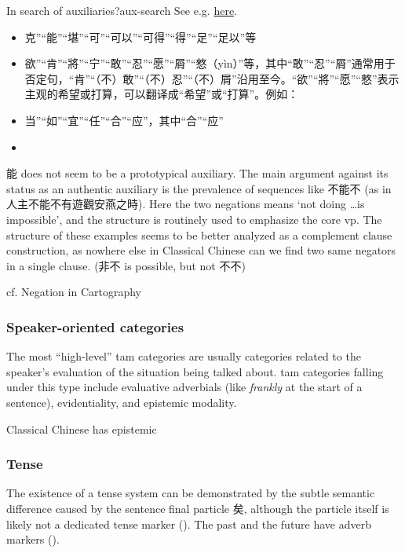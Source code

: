 \documentclass[UTF8, a4paper, oneside, scheme=plain, 12pt]{ctexrep}
\newcommand{\form}[1]{\emph{#1}}
\newcommand{\translate}[1]{`#1'}
\begin{document}
\begin{todobox}{In search of auxiliaries?}{aux-search}
    See e.g. \href{http://www.ziyexing.com/files-5/guhanyu/guhanyu_3_1.htm}{here}.
    \begin{itemize}
        \item 克”“能”“堪”“可”“可以”“可得”“得”“足”“足以”等
        \item 欲”“肯”“將”“宁”“敢”“忍”“愿”“屑”“憗（yìn）”等，其中“敢”“忍”“屑”通常用于否定句，“肯”“（不）敢”“（不）忍”“（不）屑”沿用至今。“欲”“將”“愿”“憗”表示主观的希望或打算，可以翻译成“希望”或“打算”。例如：
        \item 当”“如”“宜”“任”“合”“应”，其中“合”“应”
        \item 
    \end{itemize}
    
    能 does not seem to be a prototypical auxiliary.
    The main argument against its status as an authentic auxiliary is the prevalence of sequences like 不能不 (as in 人主不能不有遊觀安燕之時).
    Here the two negations means \translate{not doing \dots is impossible},
    and the structure is routinely used to emphasize the core \ac{vp}.
    The structure of these examples seems to be better analyzed as a complement clause construction,
    as nowhere else in Classical Chinese can we find two same negators in a single clause.
    (非不 is possible, but not 不不)

    cf. Negation in Cartography
\end{todobox}

\subsubsection{Speaker-oriented categories}

The most ``high-level'' \ac{tam} categories are usually categories related to the speaker's evaluation of the situation being talked about.
\ac{tam} categories falling under this type include evaluative adverbials (like \form{frankly} at the start of a sentence), evidentiality, and epistemic modality.

Classical Chinese has epistemic 

\subsubsection{Tense}

The existence of a tense system can be demonstrated by the subtle semantic difference caused by the sentence final particle 矣,
although the particle itself is likely not a dedicated tense marker ().
The past and the future have adverb markers ().
\end{document}
